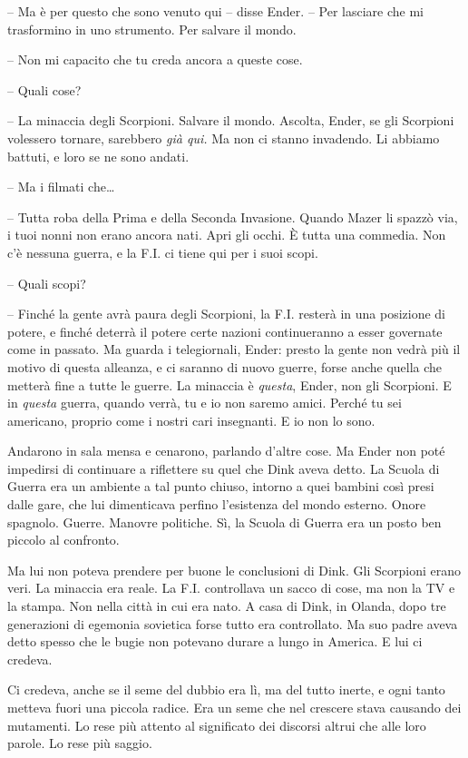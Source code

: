 {-- Ma è per questo che sono venuto qui -- disse Ender. -- Per lasciare
	che mi trasformino in uno strumento. Per salvare il mondo.}

{-- Non mi capacito che tu creda ancora a queste cose.}

{-- Quali cose?}

{-- La minaccia degli Scorpioni. Salvare il mondo. Ascolta, Ender, se
	gli Scorpioni volessero tornare, sarebbero \emph{già qui.} Ma non ci
	stanno invadendo. Li abbiamo battuti, e loro se ne sono andati.}

{-- Ma i filmati che\ldots{}}

{-- Tutta roba della Prima e della Seconda Invasione. Quando Mazer li
	spazzò via, i tuoi nonni non erano ancora nati. Apri gli occhi. È tutta
	una commedia. Non c'è nessuna guerra, e la F.I. ci tiene qui per i suoi
	scopi.}

{-- Quali scopi?}

{-- Finché la gente avrà paura degli Scorpioni, la F.I. resterà in una
	posizione di potere, e finché deterrà il potere certe nazioni
	continueranno a esser governate come in passato. Ma guarda i
	telegiornali, Ender: presto la gente non vedrà più il motivo di questa
	alleanza, e ci saranno di nuovo guerre, forse anche quella che metterà
	fine a tutte le guerre. La minaccia è \emph{questa}, \emph{} Ender, non
	gli Scorpioni. E in \emph{questa} guerra, quando verrà, tu e io non
	saremo amici. Perché tu sei americano, proprio come i nostri cari
	insegnanti. E io non lo sono.}

{Andarono in sala mensa e cenarono, parlando d'altre cose. Ma Ender non
	poté impedirsi di continuare a riflettere su quel che Dink aveva detto.
	La Scuola di Guerra era un ambiente a tal punto chiuso, intorno a quei
	bambini così presi dalle gare, che lui dimenticava perfino l'esistenza
	del mondo esterno. Onore spagnolo. Guerre. Manovre politiche. Sì, la
	Scuola di Guerra era un posto ben piccolo al confronto.}

{Ma lui non poteva prendere per buone le conclusioni di Dink. Gli
	Scorpioni erano veri. La minaccia era reale. La F.I. controllava un
	sacco di cose, ma non la TV e la stampa. Non nella città in cui era
	nato. A casa di Dink, in Olanda, dopo tre generazioni di egemonia
	sovietica forse tutto era controllato. Ma suo padre aveva detto spesso
	che le bugie non potevano durare a lungo in America. E lui ci credeva.}

{Ci credeva, anche se il seme del dubbio era lì, ma del tutto inerte, e
	ogni tanto metteva fuori una piccola radice. Era un seme che nel
	crescere stava causando dei mutamenti. Lo rese più attento al
	significato dei discorsi altrui che alle loro parole. Lo rese più
	saggio.}

